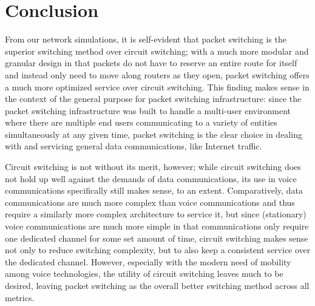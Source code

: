\documentclass{article}
\begin{document}
  \section{Conclusion}

  From our network simulations, it is self-evident that packet switching is the superior switching
  method over circuit switching; with a much more modular and granular design in that packets do
  not have to reserve an entire route for itself and instead only need to move along routers as
  they open, packet switching offers a much more optimized service over circuit switching. This
  finding makes sense in the context of the general purpose for packet switching infrastructure:
  since the packet switching infrastructure was built to handle a multi-user environment where
  there are multiple end users communicating to a variety of entities simultaneously at any given
  time, packet switching is the clear choice in dealing with and servicing general data
  communications, like Internet traffic.

  Circuit switching is not without its merit, however; while circuit switching does not hold up
  well against the demands of data communications, its use in voice communications specifically
  still makes sense, to an extent. Comparatively, data communications are much more complex than
  voice communications and thus require a similarly more complex architecture to service it, but
  since (stationary) voice communications are much more simple in that communications only require
  one dedicated channel for some set amount of time, circuit switching makes sense not only to
  reduce switching complexity, but to also keep a consistent service over the dedicated channel.
  However, especially with the modern need of mobility among voice technologies, the utility of
  circuit switching leaves much to be desired, leaving packet switching as the overall better
  switching method across all metrics.
\end{document}
